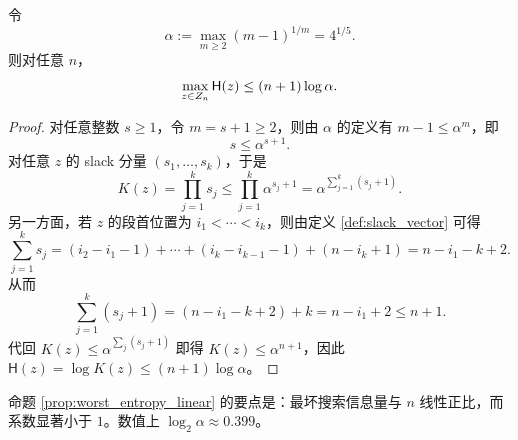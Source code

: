 \begin{proposition}[最坏时间信息量的线性上界]\label{prop:worst_entropy_linear}
令
$$
\alpha:=\max_{m\ge 2}(m-1)^{1/m}=4^{1/5}.
$$
则对任意 $n$，
$$
\max_{z\in Z_n} \mathsf{H}(z)\le (n+1)\log\alpha.
$$
\end{proposition}

\begin{proof}
对任意整数 $s\ge 1$，令 $m=s+1\ge 2$，则由 $\alpha$ 的定义有 $m-1\le \alpha^m$，即
$$
s\le \alpha^{s+1}.
$$
对任意 $z$ 的 slack 分量 $(s_1,\ldots,s_k)$，于是
$$
K(z)=\prod_{j=1}^k s_j\le \prod_{j=1}^k \alpha^{s_j+1}=\alpha^{\sum_{j=1}^k (s_j+1)}.
$$
另一方面，若 $z$ 的段首位置为 $i_1<\cdots<i_k$，则由定义 \ref{def:slack_vector} 可得
$$
\sum_{j=1}^k s_j
=(i_2-i_1-1)+\cdots+(i_k-i_{k-1}-1)+(n-i_k+1)
=n-i_1-k+2.
$$
从而
$$
\sum_{j=1}^k (s_j+1)=(n-i_1-k+2)+k=n-i_1+2\le n+1.
$$
代回 $K(z)\le \alpha^{\sum_j(s_j+1)}$ 即得 $K(z)\le \alpha^{n+1}$，因此 $\mathsf{H}(z)=\log K(z)\le (n+1)\log\alpha$。
\end{proof}

\begin{remark}
命题 \ref{prop:worst_entropy_linear} 的要点是：最坏搜索信息量与 $n$ 线性正比，而系数显著小于 $1$。数值上 $\log_2 \alpha\approx 0.399$。
\end{remark}

